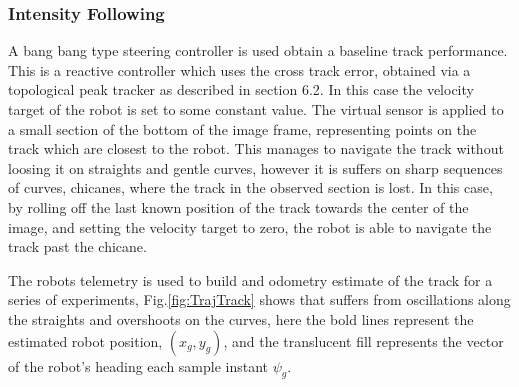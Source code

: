             \subsubsection{Intensity Following}
            A bang bang type steering controller is used obtain a baseline track performance. 
            This is a reactive controller which uses the cross track error, obtained via a topological peak tracker as described in section 6.2.
            In this case the velocity target of the robot is set to some constant value. 
            The virtual sensor is applied to a small section of the bottom of the image frame, representing points on the track which are closest to the robot. 
            This manages to navigate the track without loosing it on straights and gentle curves, however it is suffers on
            sharp sequences of curves, chicanes, where the track in the observed section is lost. In this case, by rolling off the last known position 
            of the track towards the center of the image, and setting the velocity target to zero, the robot is able to navigate the track past the chicane.
            
            The robots telemetry is used to build and odometry estimate of the track for a series of experiments, Fig.\ref{fig:TrajTrack} shows that suffers 
            from oscillations along the straights and overshoots on the curves, here the bold lines represent the estimated robot position, $(x_g, y_g)$, and the
            translucent fill represents the vector of the robot's heading each sample instant $\psi_g$. 
        
